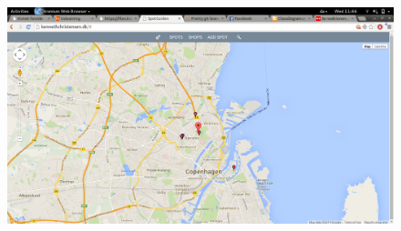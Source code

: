\documentclass[12pt]{article}
\begin{document}
\begin{figure}[h]
\includegraphics[scale = 0.3]{screen1}
\end{figure}
\end{document}
